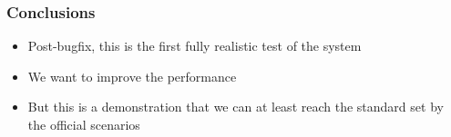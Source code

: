 \documentclass[compress]{beamer}
\begin{document}
\begin{frame}
\frametitle{Conclusions}
\begin{itemize}\setlength{\itemsep}{0.5 cm}

\item Post-bugfix, this is the first fully realistic test of the system

\item We want to improve the performance

\item But this is a demonstration that we can at least reach the
standard set by the official scenarios

\end{itemize}

\vfill \mbox{ }

\label{numpages}
\end{frame}
\end{document}
